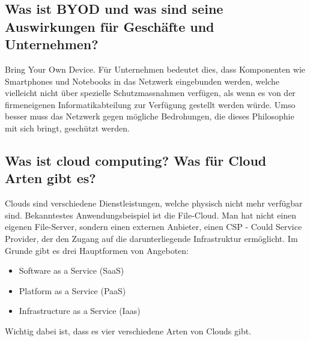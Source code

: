 \subsection*{Was ist \flqq BYOD\frqq{} und was sind seine Auswirkungen für Geschäfte und Unternehmen?}
Bring Your Own Device. Für Unternehmen bedeutet dies, dass Komponenten wie Smartphones und Notebooks in das Netzwerk eingebunden werden, welche vielleicht nicht über spezielle Schutzmassnahmen verfügen, als wenn es von der firmeneigenen Informatikabteilung zur Verfügung gestellt werden würde. Umso besser muss das Netzwerk gegen mögliche Bedrohungen, die dieses Philosophie mit sich bringt, geschützt werden.
\subsection*{Was ist \flqq cloud computing\frqq{}? Was für Cloud Arten gibt es?}
Clouds sind verschiedene Dienstleistungen, welche physisch nicht mehr verfügbar sind. Bekanntestes Anwendungsbeispiel ist die File-Cloud. Man hat nicht einen eigenen File-Server, sondern einen externen Anbieter, einen CSP - Could Service Provider, der den Zugang auf die darunterliegende Infrastruktur ermöglicht. Im Grunde gibt es drei Hauptformen von Angeboten:
\begin{itemize}
    \item Software as a Service (SaaS)
    \item Platform as a Service (PaaS)
    \item Infrastructure as a Service (Iaas)
\end{itemize}
Wichtig dabei ist, dass es vier verschiedene Arten von Clouds gibt.
